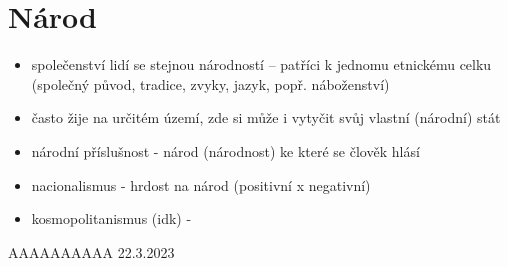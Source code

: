 \documentclass{article}
\begin{document}
\section{Národ}
\begin{itemize}
  \item společenství lidí se stejnou národností -- patříci k jednomu etnickému celku (společný původ, tradice, zvyky, jazyk, popř. náboženství)
  \item často žije na určitém území, zde si může i vytyčit svůj vlastní (národní) stát
  \item národní příslušnost - národ (národnost) ke které se člověk hlásí
  \item nacionalismus - hrdost na národ (positivní x negativní)
  \item kosmopolitanismus (idk) - 
\end{itemize}

AAAAAAAAAA 22.3.2023
\end{document}
